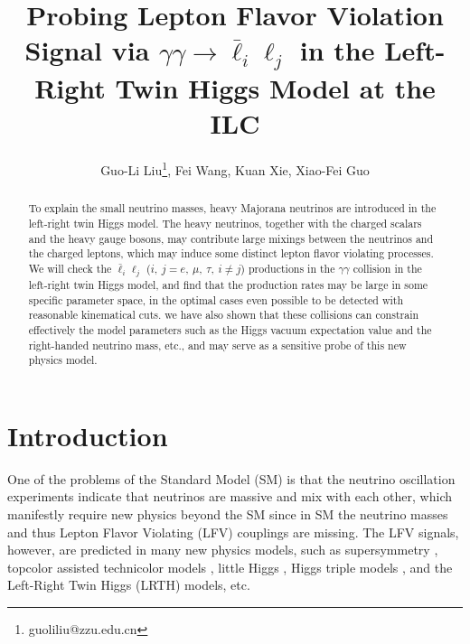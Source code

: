 \documentclass[preprint,aps,12pt,showpacs,nofootinbib,tightenlines]{revtex4}
\begin{document}

\title{Probing Lepton Flavor Violation Signal via
 $\gamma\gamma\to  \bar \ell_i \ell_j$ in the
Left-Right Twin Higgs Model at the ILC}

\author{Guo-Li Liu\footnote{guoliliu@zzu.edu.cn}, Fei Wang, Kuan Xie, Xiao-Fei Guo }



\begin{abstract}
To explain the small neutrino masses, heavy Majorana neutrinos are introduced in the left-right twin Higgs model.
The heavy neutrinos, together with the charged scalars and the heavy gauge
bosons, may contribute large mixings between the neutrinos and the charged leptons,
which may induce some distinct lepton flavor violating processes. We will check
the $\bar \ell_i \ell_j$ ($i,~j= e,~\mu,~\tau,~i\neq j$) productions
in the $\gamma$$\gamma$ collision in the left-right twin Higgs model,
and find that the production rates may be large in some specific parameter space,
in the optimal cases even possible to be detected with reasonable kinematical cuts.
we have also shown that these collisions can constrain effectively the model parameters
such as the Higgs vacuum expectation value and the right-handed neutrino mass, etc.,
and may serve as a sensitive probe of this new physics model.
\end{abstract}


\maketitle

\newpage
\section{ Introduction}
One of the problems of the Standard Model (SM) is that
the neutrino oscillation experiments indicate that neutrinos are massive and mix with each other,
which manifestly require new physics beyond the SM \cite{oscillneutrinos} since in SM
the neutrino masses and thus Lepton Flavor Violating (LFV) couplings are missing.
The LFV signals, however,
are predicted in many new physics models, such as supersymmetry \cite{susy},
topcolor assisted technicolor models \cite{tc2-review}, little Higgs \cite{lh-review},
 Higgs triple models \cite{htm-review}, and the Left-Right Twin Higgs (LRTH) \cite{lrth-review} models, etc.
\end{document}
